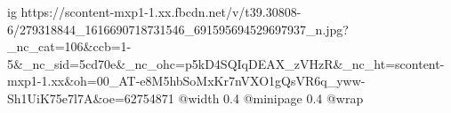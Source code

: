  
 
 
 
 

\ifcmt
  ig https://scontent-mxp1-1.xx.fbcdn.net/v/t39.30808-6/279318844_1616690718731546_691595694529697937_n.jpg?_nc_cat=106&ccb=1-5&_nc_sid=5cd70e&_nc_ohc=p5kD4SQIqDEAX_zVHzR&_nc_ht=scontent-mxp1-1.xx&oh=00_AT-e8M5hbSoMxKr7nVXO1gQsVR6q_yww-Sh1UiK75e7l7A&oe=62754871
  @width 0.4
  @minipage 0.4
  @wrap \parpic[r]
\fi
